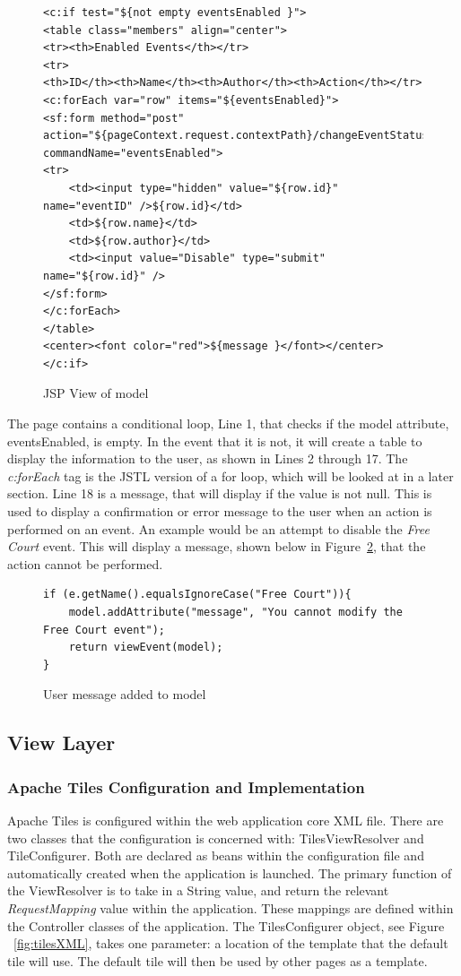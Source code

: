 \begin{figure}[H]
\begin{lstlisting}
<c:if test="${not empty eventsEnabled }">
<table class="members" align="center">
<tr><th>Enabled Events</th></tr>
<tr>
<th>ID</th><th>Name</th><th>Author</th><th>Action</th></tr>
<c:forEach var="row" items="${eventsEnabled}">
<sf:form method="post"
action="${pageContext.request.contextPath}/changeEventStatus"
commandName="eventsEnabled">
<tr>
	<td><input type="hidden" value="${row.id}" name="eventID" />${row.id}</td>
	<td>${row.name}</td>
	<td>${row.author}</td>
	<td><input value="Disable" type="submit" name="${row.id}" />
</sf:form>
</c:forEach>
</table>
<center><font color="red">${message }</font></center>
</c:if>
\end{lstlisting}
\caption{JSP View of model}
\label{fig:modelJSP}
\end{figure}

The page contains a conditional loop, Line 1, that checks if the model attribute, eventsEnabled, is empty. In the event that it is not, it will create a table to display the information to the user, as shown in Lines 2 through 17. The \textit{c:forEach} tag is the JSTL version of a for loop, which will be looked at in a later section. Line 18 is a message, that will display if the value is not null. This is used to display a confirmation or error message to the user when an action is performed on an event. An example would be an attempt to disable the \textit{Free Court} event. This will display a message, shown below in Figure~\ref{fig:modelFail}, that the action cannot be performed.

\begin{figure}[H]
\begin{lstlisting}
if (e.getName().equalsIgnoreCase("Free Court")){
	model.addAttribute("message", "You cannot modify the Free Court event");
	return viewEvent(model);
}
\end{lstlisting}
\caption{User message added to model}
\label{fig:modelFail}
\end{figure}

\subsection{View Layer}
\subsubsection{Apache Tiles Configuration and Implementation}
Apache Tiles is configured within the web application core XML file. There are two classes that the configuration is concerned with: TilesViewResolver and TileConfigurer. Both are declared as beans within the configuration file and automatically created when the application is launched. The primary function of the ViewResolver is to take in a String value, and return the relevant \textit{RequestMapping} value within the application. These mappings are defined within the Controller classes of the application. The TilesConfigurer object, see Figure ~\ref{fig:tilesXML}, takes one parameter: a location of the template that the default tile will use. The default tile will then be used by other pages as a template. \newline

